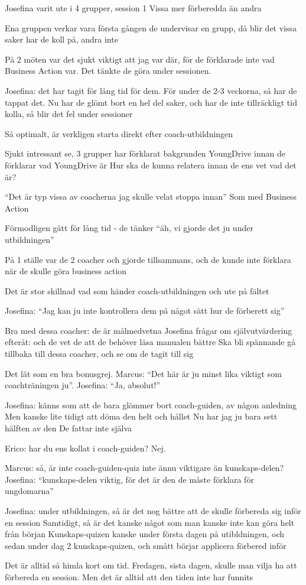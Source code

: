 Josefina varit ute i 4 grupper, session 1
Vissa mer förberedda än andra

Ena gruppen verkar vara första gången de undervisar en grupp, då blir det vissa saker har de koll på, andra inte

På 2 möten var det sjukt viktigt att jag var där, för de förklarade inte vad Business Action var. Det tänkte de göra under sessionen.

Josefina: det har tagit för lång tid för dem. För under de 2-3 veckorna, så har de tappat det. Nu har de glömt bort en hel del saker, och har de inte tillräckligt tid kolla, så blir det fel under sessioner

Så optimalt, är verkligen starta direkt efter coach-utbildningen

Sjukt intressant se, 3 grupper har förklarat bakgrunden YoungDrive innan de förklarar vad YoungDrive är
Hur ska de kunna relatera innan de ens vet vad det är?

“Det är typ vissa av coacherna jag skulle velat stoppa innan”
Som med Business Action

Förmodligen gått för lång tid - de tänker “äh, vi gjorde det ju under utbildningen”

På 1 ställe var de 2 coacher och gjorde tillsammans, och de kunde inte förklara när de skulle göra business action

Det är stor skillnad vad som händer coach-utbildningen och ute på fältet

Josefina: “Jag kan ju inte kontrollera dem på något sätt hur de förberett sig”

Bra med dessa coacher: de är målmedvetna
Josefina frågar om självutvärdering efteråt: och de vet de att de behöver läsa manualen bättre
Ska bli spännande gå tillbaka till dessa coacher, och se om de tagit till sig

Det lät som en bra bonusgrej.
Marcus: “Det här är ju minst lika viktigt som coachträningen ju”. Josefina: “Ja, absolut!”

Josefina: känns som att de bara glömmer bort coach-guiden, av någon anledning
Men kanske lite tidigt att döma den helt och hållet
Nu har jag ju bara sett hälften av den
De fattar inte själva

Erico: har du ens kollat i coach-guiden? Nej. 

Marcus: så, är inte coach-guiden-quiz inte ännu viktigare än kunskaps-delen?
Josefina: “kunskaps-delen viktig, för det är den de måste förklara för ungdomarna”

Josefina: under utbildningen, så är det nog bättre att de skulle förbereda sig inför en session
Samtidigt, så är det kanske något som man kanske inte kan göra helt från början
Kunskaps-quizen kanske under första dagen på utibldningen, och sedan under dag 2 kunskaps-quizen, och smått börjar applicera förbered inför

Det är alltid så himla kort om tid. Fredagen, sista dagen, skulle man vilja ha att förbereda en session. Men det är alltid att den tiden inte har funnits
